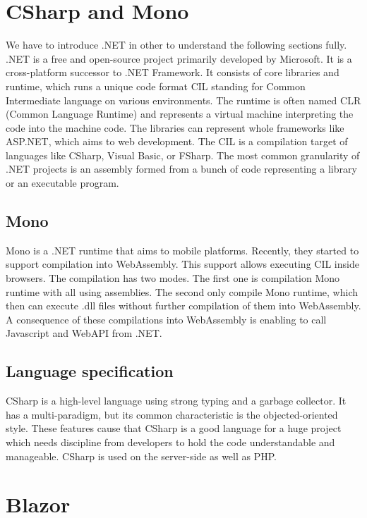 \section{CSharp and Mono}

We have to introduce .NET  in other to understand the following sections fully.
.NET is a free and open-source project primarily developed by Microsoft.
It is a cross-platform successor to .NET Framework.
It consists of core libraries and runtime, which runs a unique code format CIL standing for Common Intermediate language on various environments.
The runtime is often named CLR (Common Language Runtime) and represents a virtual machine interpreting the code into the machine code.
The libraries can represent whole frameworks like ASP.NET, which aims to web development.
The CIL is a compilation target of languages like CSharp, Visual Basic, or FSharp.
The most common granularity of .NET projects is an assembly formed from a bunch of code representing a library or an executable program.

\subsection{Mono}

Mono is a .NET runtime that aims to mobile platforms. 
Recently, they started to support compilation  into WebAssembly.
This support allows executing CIL inside browsers.
The compilation has two modes.
The first one is compilation Mono runtime with all using assemblies.
The second only compile Mono runtime, which then can execute .dll files without further compilation of them into WebAssembly.
A consequence of these compilations into WebAssembly is enabling to call Javascript and WebAPI from .NET.

\subsection{Language specification}

CSharp is a high-level language using strong typing and a garbage collector.
It has a multi-paradigm, but its common characteristic is the objected-oriented style.
These features cause that CSharp is a good language for a huge project which needs discipline from developers to hold the code understandable and manageable.
CSharp is used on the server-side as well as PHP.

\section{Blazor}

